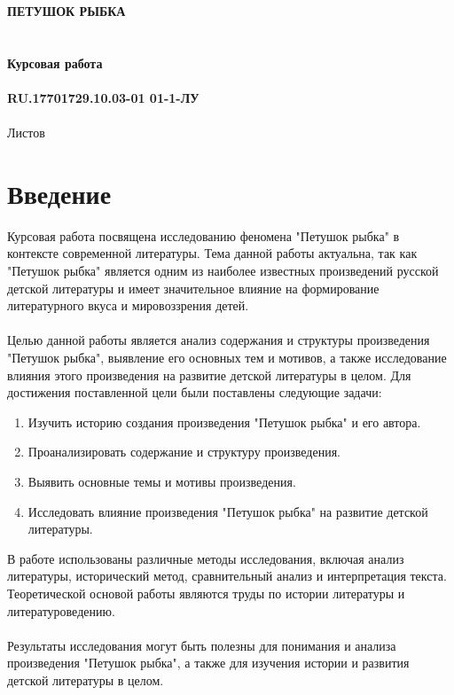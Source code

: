 \documentclass{article}
\begin{document}
\fontsize{14}{16}\selectfont
\thispagestyle{empty}
\clearpage
{}
\bigskip
\begin{center}
\topskip=0pt
\vspace*{\fill}
\textbf{ПЕТУШОК РЫБКА~\\
~\\
~\\
Курсовая работа\\
~\\
RU.17701729.10.03-01 01-1-ЛУ}\\
~\\
Листов \ztotpages\\
\vspace*{\fill}
\end{center}
\begin{center}
\end{center}
\newpage
\tableofcontents
\newpage
\newpage
\section{Введение}
Курсовая работа посвящена исследованию феномена "{}Петушок рыбка"{} в контексте современной литературы. Тема данной работы актуальна, так как "{}Петушок рыбка"{} является одним из наиболее известных произведений русской детской литературы и имеет значительное влияние на формирование литературного вкуса и мировоззрения детей.\\
~\\
Целью данной работы является анализ содержания и структуры произведения "{}Петушок рыбка"{}, выявление его основных тем и мотивов, а также исследование влияния этого произведения на развитие детской литературы в целом. Для достижения поставленной цели были поставлены следующие задачи:
\begin{enumerate}
\item Изучить историю создания произведения "{}Петушок рыбка"{} и его автора.
\item Проанализировать содержание и структуру произведения.
\item Выявить основные темы и мотивы произведения.
\item Исследовать влияние произведения "{}Петушок рыбка"{} на развитие детской литературы.
\end{enumerate}
В работе использованы различные методы исследования, включая анализ литературы, исторический метод, сравнительный анализ и интерпретация текста. Теоретической основой работы являются труды по истории литературы и литературоведению.\\
~\\
Результаты исследования могут быть полезны для понимания и анализа произведения "{}Петушок рыбка"{}, а также для изучения истории и развития детской литературы в целом.
\end{document}
